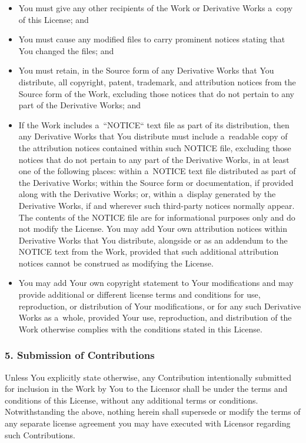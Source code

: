 \documentclass[a4paper, 11pt, twoside]{article}
\begin{document}
\begin{itemize}
\item You must give any other recipients of the Work or Derivative Works a~copy of this License; and
\item You must cause any modified files to carry prominent notices stating that You changed the files; and
\item You must retain, in the Source form of any Derivative Works that You distribute, all copyright, patent, trademark, and attribution notices from the Source form of the Work, excluding those notices that do not pertain to any part of the Derivative Works; and
\item If the Work includes a~“NOTICE“ text file as part of its distribution, then any Derivative Works that You distribute must include a~readable copy of the attribution notices contained within such NOTICE file, excluding those notices that do not pertain to any part of the Derivative Works, in at least one of the following places: within a~NOTICE text file distributed as part of the Derivative Works; within the Source form or documentation, if provided along with the Derivative Works; or, within a~display generated by the Derivative Works, if and wherever such third-party notices normally appear. The contents of the NOTICE file are for informational purposes only and do not modify the License. You may add Your own attribution notices within Derivative Works that You distribute, alongside or as an addendum to the NOTICE text from the Work, provided that such additional attribution notices cannot be construed as modifying the License.
\item You may add Your own copyright statement to Your modifications and may provide additional or different license terms and conditions for use, reproduction, or distribution of Your modifications, or for any such Derivative Works as a~whole, provided Your use, reproduction, and distribution of the Work otherwise complies with the conditions stated in this License.
\end{itemize}

\subsubsection{5. Submission of Contributions}

Unless You explicitly state otherwise, any Contribution intentionally submitted for inclusion in the Work by You to the Licensor shall be under the terms and conditions of this License, without any additional terms or conditions. Notwithstanding the above, nothing herein shall supersede or modify the terms of any separate license agreement you may have executed with Licensor regarding such Contributions.
\end{document}
